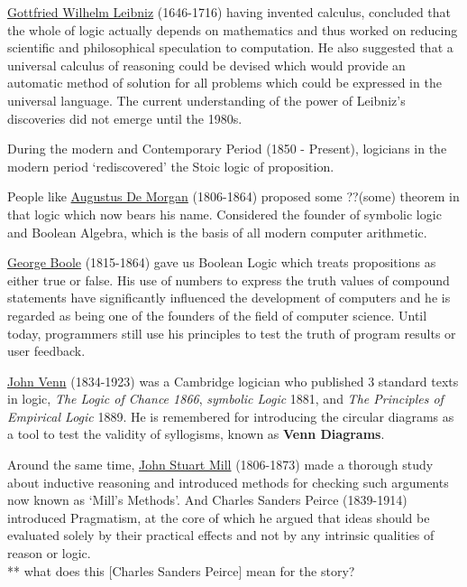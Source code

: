 \documentclass[]{book}
\theoremstyle{definition}
\theoremstyle{definition}
\theoremstyle{definition}
\theoremstyle{remark}
\begin{document}
\href{https://en.wikipedia.org/wiki/Gottfried_Wilhelm_Leibniz}{Gottfried
Wilhelm Leibniz} (1646-1716) having invented calculus, concluded that
the whole of logic actually depends on mathematics and thus worked on
reducing scientific and philosophical speculation to computation. He
also suggested that a universal calculus of reasoning could be devised
which would provide an automatic method of solution for all problems
which could be expressed in the universal language. The current
understanding of the power of Leibniz's discoveries did not emerge until
the 1980s.

During the modern and Contemporary Period (1850 - Present), logicians in
the modern period `rediscovered' the Stoic logic of proposition.

People like
\href{https://en.wikipedia.org/wiki/Augustus_De_Morgan}{Augustus De
Morgan} (1806-1864) proposed some ??(some) theorem in that logic which
now bears his name. Considered the founder of symbolic logic and Boolean
Algebra, which is the basis of all modern computer arithmetic.

\href{https://en.wikipedia.org/wiki/George_Boole}{George Boole}
(1815-1864) gave us Boolean Logic which treats propositions as either
true or false. His use of numbers to express the truth values of
compound statements have significantly influenced the development of
computers and he is regarded as being one of the founders of the field
of computer science. Until today, programmers still use his principles
to test the truth of program results or user feedback.

\href{https://en.wikipedia.org/wiki/John_Venn}{John Venn} (1834-1923)
was a Cambridge logician who published 3 standard texts in logic,
\emph{The Logic of Chance 1866}, \emph{symbolic Logic} 1881, and
\emph{The Principles of Empirical Logic} 1889. He is remembered for
introducing the circular diagrams as a tool to test the validity of
syllogisms, known as \textbf{Venn Diagrams}.

Around the same time,
\href{https://en.wikipedia.org/wiki/John_Stuart_Mill}{John Stuart Mill}
(1806-1873) made a thorough study about inductive reasoning and
introduced methods for checking such arguments now known as `Mill's
Methods'. And Charles Sanders Peirce (1839-1914) introduced Pragmatism,
at the core of which he argued that ideas should be evaluated solely by
their practical effects and not by any intrinsic qualities of reason or
logic.\\
** what does this {[}Charles Sanders Peirce{]} mean for the story?
\end{document}
